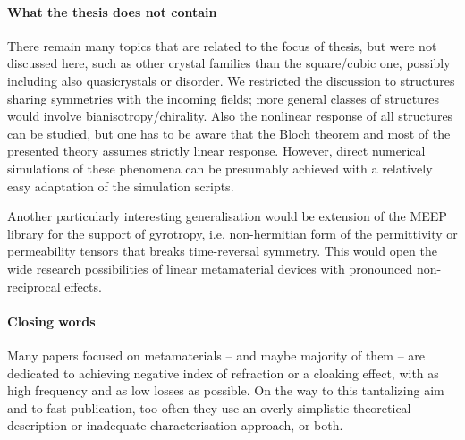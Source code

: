 

\paragraph{What the thesis does not contain} 
There remain many topics that are related to the focus of thesis, but were not discussed here, such as other crystal families than the square/cubic one, possibly including also quasicrystals or disorder. We restricted the discussion to structures sharing symmetries with the incoming fields; more general classes of structures would involve bianisotropy/chirality. Also the nonlinear response of all structures can be studied, but one has to be aware that the Bloch theorem and most of the presented theory assumes strictly linear response. However, direct numerical simulations of these phenomena can be presumably  achieved with a relatively easy adaptation of the simulation scripts.

Another particularly interesting generalisation would be extension of the MEEP library for the support of gyrotropy, i.e. non-hermitian form of the permittivity or permeability tensors that breaks time-reversal symmetry. This would open the wide research possibilities of linear metamaterial devices with pronounced non-reciprocal effects.

\paragraph{Closing words} 
Many papers focused on metamaterials -- and maybe majority of them -- are dedicated to achieving negative index of refraction or a cloaking effect, with as high frequency and as low losses as possible.
On the way to this tantalizing aim and to fast publication, too often they use an overly simplistic theoretical description or inadequate characterisation approach, or both. %


